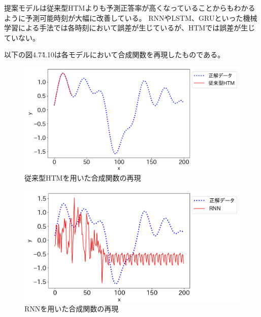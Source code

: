 提案モデルは従来型HTMよりも予測正答率が高くなっていることからもわかるように予測可能時刻が大幅に改善している。
RNNやLSTM、GRUといった機械学習による手法では各時刻において誤差が生じているが、HTMでは誤差が生じていない。

以下の図4.7\~4.10は各モデルにおいて合成関数を再現したものである。

\begin{figure}[htp]
  \begin{center}
    \includegraphics[width=14cm]{./fig/htm}
    \caption{従来型HTMを用いた合成関数の再現}
    \label{fig:htm_experiment2}
  \end{center}
\end{figure}

\begin{figure}[hp]
  \begin{center}
    \includegraphics[width=14cm]{./fig/rnn}
    \caption{RNNを用いた合成関数の再現}
    \label{fig:rnn_experiment2}
  \end{center}
\end{figure}

